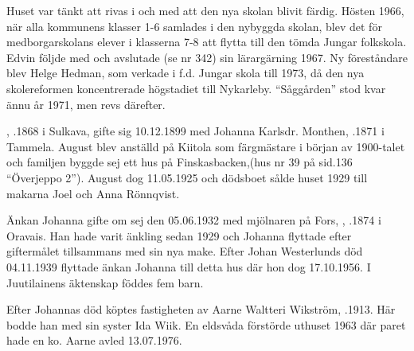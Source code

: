 Huset var tänkt att rivas i och med att den nya skolan blivit färdig. Hösten 1966, när alla kommunens klasser 1-6 samlades i den nybyggda skolan, blev det för medborgarskolans elever i klasserna 7-8 att flytta till den tömda Jungar folkskola. Edvin följde med och avslutade (se nr 342) sin lärargärning 1967. Ny föreståndare blev Helge Hedman, som verkade i f.d. Jungar skola till 1973, då den nya skolereformen koncentrerade högstadiet till Nykarleby. ``Såggården'' stod kvar ännu år 1971, men revs därefter.






, .1868 i Sulkava, gifte sig 10.12.1899 med Johanna Karlsdr. Monthen, .1871 i Tammela. August blev anställd på Kiitola som färgmästare i början av 1900-talet och familjen byggde sej ett hus på Finskasbacken,(hus nr 39 på sid.136 ``Överjeppo 2''). August dog 11.05.1925 och dödsboet sålde huset 1929 till makarna Joel och Anna Rönnqvist.

Änkan Johanna gifte om sej den 05.06.1932 med mjölnaren på Fors, , .1874 i Oravais. Han hade varit änkling sedan 1929 och Johanna flyttade efter giftermålet tillsammans med sin nya make. Efter Johan Westerlunds död 04.11.1939 flyttade änkan Johanna till detta hus där hon dog 17.10.1956. I Juutilainens äktenskap föddes fem barn.
\begin{jhchildren}
  \item {}
  \item {}
  \item {}
  \item {}
  \item {}
\end{jhchildren}
Efter Johannas död köptes fastigheten av Aarne Waltteri Wikström, .1913. Här bodde han med sin syster Ida Wiik. En eldsvåda förstörde uthuset 1963 där paret hade en ko. Aarne avled 13.07.1976.


